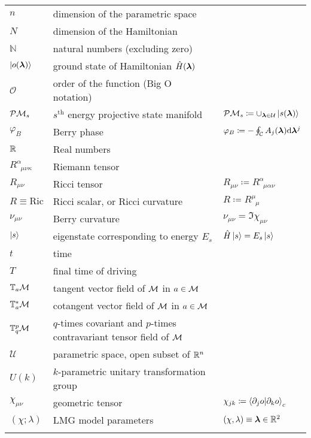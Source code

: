 \begin{tabular} {@{}C{1.9cm}@{}p{8cm}@{}C{3.77cm}}
	  $n$ & dimension of the parametric space & \\
	  $N$ & dimension of the Hamiltonian & \\
	  $\mathbb{N}$ & natural numbers (excluding zero) \\
	  $\ket{o({\bm\lambda})}$& ground state of Hamiltonian $\hat{H}({\bm\lambda})$  &  \\
	  $\mathcal O$& order of the function (Big O notation)  &  \\
	  $\mathcal{P}\mathcal{M}_s$& $s^{\text{th}}$ energy projective state manifold & $\mathcal{P}\mathcal{M}_s\coloneqq\cup_{{\bm\lambda}\in\mathcal U} \ket{s({\bm\lambda})}$ \\
	  $\varphi_B$ & Berry phase & $\varphi_B\coloneqq-\oint_\mathcal{C} A_j({\bm\lambda})\mathrm{d} {\bm\lambda}^j$\\
	  $\mathbb{R}$& Real numbers  &  \\
	  $R^\alpha_{\;\;\mu\nu\kappa}$ &Riemann tensor & \\
	  $R_{\mu\nu}$ & Ricci tensor & $R_{\mu\nu}\coloneqq R^\alpha_{\;\;\mu\alpha\nu}$\\
	  $R\equiv \mathrm{Ric}$ & Ricci scalar, or Ricci curvature & $R\coloneqq R^\mu_{\;\;\mu}$\\
	  $\nu_{\mu\nu}$ & Berry curvature & $\nu_{\mu\nu}= \Im\chi_{\mu\nu}$ \\ 
	  $\ket{s}$& eigenstate corresponding to energy $E_s$& $\hat{H}\ket{s}=E_s\ket{s}$ \\
	  $t$& time  &  \\
	  $T$& final time of driving  &  \\
	  $\mathbb T_a \mathcal{M}$& tangent vector field of $\mathcal{M}$ in $a\in \mathcal{M}$ &  \\
	  $\mathbb T_a^* \mathcal{M}$& cotangent vector field of $\mathcal{M}$ in $a\in \mathcal{M}$ &  \\
	  $\mathbb{T}^p_q\mathcal{M}$& $q$-times covariant and $p$-times contravariant tensor field of $\mathcal{M}$&  \\
	  $\mathcal U$& parametric space, open subset of $\mathbb{R}^n$  & \\
	  $U(k)$& $k$-parametric unitary transformation group  &  \\
	  $\chi_{\mu\nu}$ & geometric tensor & $\chi_{jk}\coloneqq \braket{\partial_j o|\partial_k o}_c$ \\
	  $(\chi;\lambda)$& LMG model parameters  & $(\chi,\lambda)\equiv {\bm\lambda}\in\mathbb{R}^2$ \\
\bottomrule
{}
\end{tabular}


